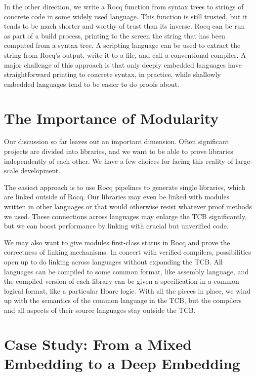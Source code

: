 \documentclass{amsbook}
\theoremstyle{definition}
\theoremstyle{remark}
\numberwithin{section}{chapter}
\numberwithin{equation}{chapter}
\begin{document}
In the other direction, we write a Rocq function from syntax trees to strings of concrete code in some widely used language.
This function is still trusted, but it tends to be much shorter and worthy of trust than its inverse.
Rocq can be run as part of a build process, printing to the screen the string that has been computed from a syntax tree.
A scripting language can be used to extract the string from Rocq's output, write it to a file, and call a conventional compiler.
A major challenge of this approach is that only deeply embedded languages have straightforward printing to concrete syntax, in practice, while shallowly embedded languages tend to be easier to do proofs about.


\section{The Importance of Modularity}

\modularity
Our discussion so far leaves out an important dimension.
Often significant projects are divided into libraries, and we want to be able to prove libraries independently of each other.
We have a few choices for facing this reality of large-scale development.

The easiest approach is to use Rocq pipelines to generate single libraries, which are linked outside of Rocq.
Our libraries may even be linked with modules written in other languages or that would otherwise resist whatever proof methods we used.
These connections across languages may enlarge the TCB significantly, but we can boost performance by linking with crucial but unverified code.

We may also want to give modules first-class status in Rocq and prove the correctness of linking mechanisms.
In concert with verified compilers, possibilities open up to do linking across languages without expanding the TCB.
All languages can be compiled to some common format, like assembly language, and the compiled version of each library can be given a specification in a common logical format, like a particular Hoare logic.
With all the pieces in place, we wind up with the semantics of the common language in the TCB, but the compilers and all aspects of their source languages stay outside the TCB.


\section{Case Study: From a Mixed Embedding to a Deep Embedding}
\end{document}
